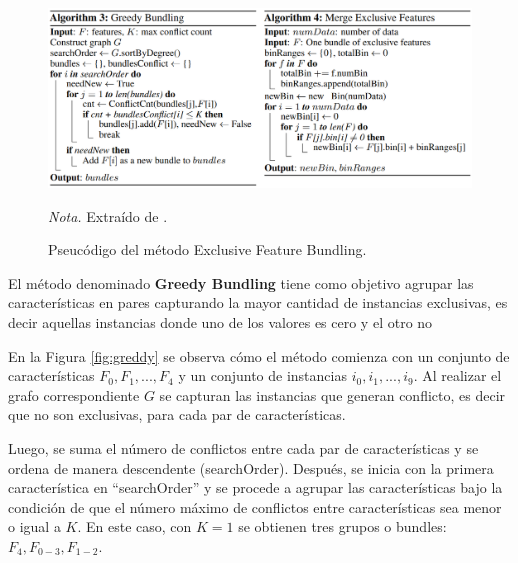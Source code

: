\begin{figure}[H]
    \centering
    \caption{Pseucódigo del método Exclusive Feature Bundling.}
    \includegraphics[width=1\textwidth]{img/4_marco_teorico/efb.png}
    \label{fig:efb}
    \begin{flushleft}
        \vspace{-\baselineskip}
        \textit{Nota.} Extraído de \citet{ke_lightgbm_2017}. 
        \vspace{-\baselineskip}
    \end{flushleft}
\end{figure}

El método denominado \textbf{Greedy Bundling} tiene como objetivo agrupar las características 
en pares capturando la mayor cantidad de instancias exclusivas, es decir aquellas instancias 
donde uno de los valores es cero y el otro no \citep{meanxai_mxml-12-03_2023}  

En la Figura \ref{fig:greddy} se observa cómo el método comienza con un conjunto de características $F_{0}, F_{1}, ..., F_{4}$ y un conjunto de instancias $i_{0}, i_{1}, ..., i_{9}$. Al realizar el grafo correspondiente $G$ se capturan las 
instancias que generan conflicto, es decir que no son exclusivas, para cada par de características.

Luego, se suma el número de conflictos entre cada par de características y se ordena de manera descendente (searchOrder).
Después, se inicia con la primera característica en ``searchOrder'' y se procede a agrupar las características bajo la condición de que el número máximo de conflictos entre características sea menor o igual a $K$. 
En este caso, con $K = 1$ se obtienen tres grupos o bundles: $F_4, F_{0-3}, F_{1-2}$.

